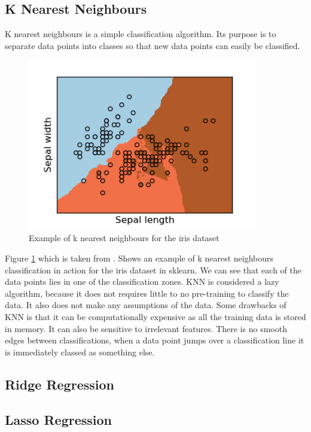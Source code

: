 \subsection*{K Nearest Neighbours}

K nearest neighbours is a simple classification algorithm. Its purpose is to separate data points into classes so that new data points can easily be classified.
\begin{figure}[H]
  \centering
  \includegraphics[scale=0.5,width=100mm]{./images/k-nearest-neighbours-example.png}
  \caption{Example of k nearest neighbours for the iris dataset}
  \label{fig:k-nearest-neighbours-example}
\end{figure}
Figure \ref{fig:k-nearest-neighbours-example} which is taken from \cite{kNearestNeighboursExample}. Shows an example of k nearest neighbours classification in action for the iris dataset in sklearn. We can see that each of the data points lies in one of the classification zones. KNN is considered a lazy algorithm, because it does not requires little to no pre-training to classify the data. It also does not make any assumptions of the data. Some drawbacks of KNN is that it can be computationally expensive as all the training data is stored in memory. It can also be sensitive to irrelevant features. There is no smooth edges between classifications, when a data point jumps over a classification line it is immediately classed as something else.

\subsection*{Ridge Regression}
\subsection*{Lasso Regression}

